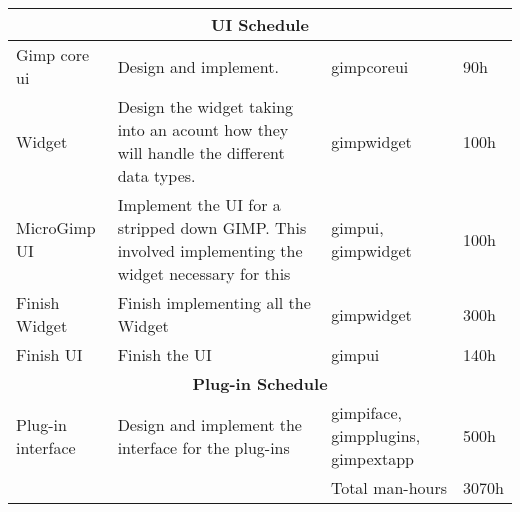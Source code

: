 \begin{flushleft}
\begin{tabular}{|p{3cm}|p{4.5cm}|p{2cm}|l|}
\multicolumn{4}{|c|}{\bf UI Schedule}\\
\hline 
Gimp core ui & Design and implement. & gimpcoreui & 90h\\
\hline
Widget & Design the widget taking into an acount how they will handle the different data types. & gimpwidget &100h\\
\hline
MicroGimp UI & Implement the UI for a stripped down GIMP. This involved implementing the widget necessary for this& gimpui, gimpwidget & 100h\\
\hline
Finish Widget & Finish implementing all the Widget & gimpwidget & 300h\\
\hline
Finish UI & Finish the UI & gimpui & 140h\\
\hline 

\multicolumn{4}{|c|}{\bf Plug-in Schedule}\\
\hline
Plug-in interface & Design and implement the interface for the plug-ins & gimpiface, gimpplugins, gimpextapp & 500h\\ 
\hline
 
\multicolumn{3}{|r|}{Total man-hours} & 3070h\\
\hline
\end{tabular}
\end{flushleft}

	
